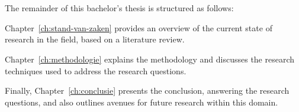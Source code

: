 \section{}%
\label{sec:opzet-bachelorproef}


The remainder of this bachelor's thesis is structured as follows:

Chapter~\ref{ch:stand-van-zaken} provides an overview of the current state of research in the field, based on a literature review.

Chapter~\ref{ch:methodologie} explains the methodology and discusses the research techniques used to address the research questions.


Finally, Chapter~\ref{ch:conclusie} presents the conclusion, answering the research questions, and also outlines avenues for future research within this domain.